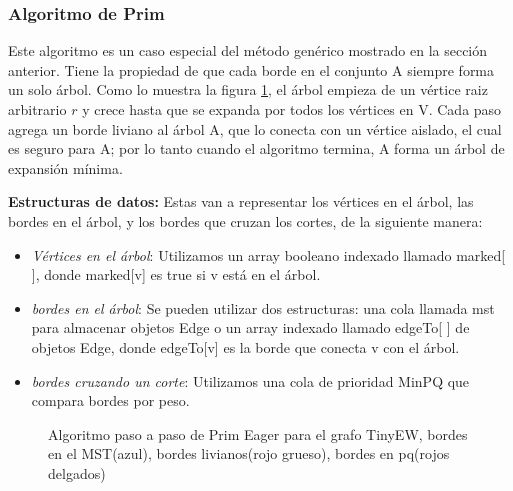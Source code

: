 \documentclass[a4paper, 11pt]{report}
\newcommand{\DrawEJcGraph}[5]{

    \begin{scope}[#5]
    \foreach \pos/\nodo in {{(0,0)/4}, {(0,1.2)/5}, {(1,1)/7}, {(2,2.2)/1}, {(2,0.6)/0}, {(3.4,0.9)/2}, {(3.4,2.2)/3}, {(5,0)/6}}
        \node[vertex] (#3\nodo) at \pos {\nodo};
    \foreach \start/\end in {4/5, 5/7, 7/1,7/0,0/2,2/3,2/6,4/7,1/5,0/4,1/2,1/3,2/7,3/6,6/0,6/4}
        \path[edge,#5] (#3\start) -- (#3\end);

    \foreach \nodo in {#1}
        \node[selected vertex] at (#3\nodo) {\nodo};

    \begin{pgfonlayer}{background}%
        \foreach \start/\end in {#2}
            \path[rojod edge,#5] (#3\start) -- (#3\end);
    \end{pgfonlayer}
    \begin{pgfonlayer}{background}%
        \foreach \start/\end in {#3}
            \path[rojog edge,#5] (#3\start) -- (#3\end);
    \end{pgfonlayer}
    \begin{pgfonlayer}{background}%
        \foreach \start/\end in {#4}
            \path[azul edge,#5] (#3\start) -- (#3\end);
    \end{pgfonlayer}
    \end{scope}

}
\newcommand{\DrawArrow}[1]{
    \begin{scope}[scale=0.5,#1]
        \filldraw[arrow] (0,0) -- (2,0) -- +(270:0.5) -- (3,0.5) -- (2,1.5) -- +(270:0.5) -- (0,1) -- cycle;
    \end{scope}
}
\begin{document}
\subsubsection{Algoritmo de Prim}

Este algoritmo es un caso especial del método genérico mostrado en la sección anterior. Tiene la propiedad de que cada borde en el conjunto A siempre forma un solo árbol. Como lo muestra la figura \ref{MST4}, el árbol empieza de un vértice raiz arbitrario $r$ y crece hasta que se expanda por todos los vértices en V. Cada paso agrega un borde liviano al árbol A, que lo conecta con un vértice aislado, el cual es seguro para A; por lo tanto cuando el algoritmo termina, A forma un árbol de expansión mínima. 

\textbf{Estructuras de datos:} Estas van a representar los vértices en el árbol, las bordes en el árbol, y los bordes que cruzan los cortes, de la siguiente manera:
\begin{itemize}
\item \textit{Vértices en el árbol}: Utilizamos un array booleano indexado llamado marked[ ], donde marked[v] es true si v está en el árbol.
\item \textit{bordes en el árbol}: Se pueden utilizar dos estructuras: una cola llamada mst para almacenar objetos Edge o un array indexado llamado edgeTo[ ] de objetos Edge, donde edgeTo[v] es la borde que conecta v con el árbol.
\item \textit{bordes cruzando un corte}: Utilizamos una cola de prioridad MinPQ que compara bordes por peso.  
\end{itemize}

\begin{figure}[!h]
    \caption{Algoritmo paso a paso de Prim Eager para el grafo TinyEW, bordes en el MST(azul), bordes livianos(rojo grueso), bordes en pq(rojos delgados)}
    \label{MST4}
\end{figure}
\end{document}
